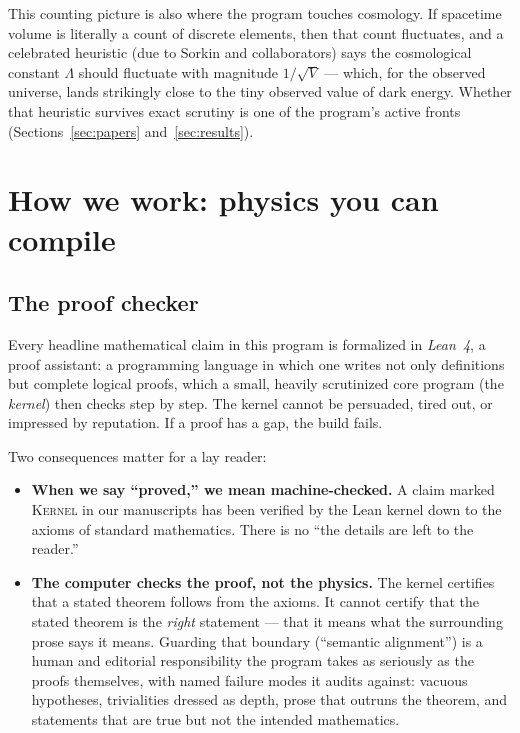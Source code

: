 \documentclass[11pt]{article}
\newcommand{\Kernel}{\textcolor{kernelcolor}{\textsc{Kernel}}}
\newcommand{\Lam}{\Lambda}
\begin{document}
This counting picture is also where the program touches cosmology.  If
spacetime volume is literally a count of discrete elements, then that
count fluctuates, and a celebrated heuristic (due to Sorkin and
collaborators) says the cosmological constant $\Lam$ should fluctuate with
magnitude $1/\sqrt{V}$ --- which, for the observed universe, lands
strikingly close to the tiny observed value of dark energy.  Whether that
heuristic survives exact scrutiny is one of the program's active fronts
(Sections~\ref{sec:papers} and~\ref{sec:results}).

\section{How we work: physics you can compile}\label{sec:method}

\subsection{The proof checker}

Every headline mathematical claim in this program is formalized in
\emph{Lean~4}, a proof assistant: a programming language in which one
writes not only definitions but complete logical proofs, which a small,
heavily scrutinized core program (the \emph{kernel}) then checks step by
step.  The kernel cannot be persuaded, tired out, or impressed by
reputation.  If a proof has a gap, the build fails.

Two consequences matter for a lay reader:

\begin{itemize}
\item \textbf{When we say ``proved,'' we mean machine-checked.}  A claim
  marked \Kernel{} in our manuscripts has been verified by the Lean kernel
  down to the axioms of standard mathematics.  There is no ``the details
  are left to the reader.''
\item \textbf{The computer checks the proof, not the physics.}  The kernel
  certifies that a stated theorem follows from the axioms.  It cannot
  certify that the stated theorem is the \emph{right} statement --- that
  it means what the surrounding prose says it means.  Guarding that
  boundary (``semantic alignment'') is a human and editorial
  responsibility the program takes as seriously as the proofs themselves,
  with named failure modes it audits against: vacuous hypotheses,
  trivialities dressed as depth, prose that outruns the theorem, and
  statements that are true but not the intended mathematics.
\end{itemize}
\end{document}
